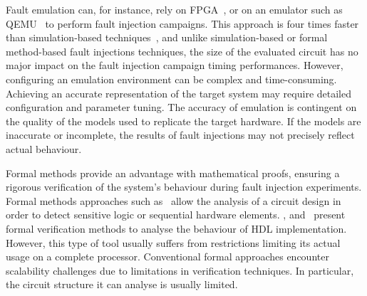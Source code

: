Fault emulation can, for instance, rely on FPGA~\cite{CMLCVR-11-crypto}, or on an emulator such as QEMU~\cite{HGASO-21-fdtc,BLK-23-access} to perform fault injection campaigns. This approach is four times faster than simulation-based techniques~\cite{NNHRS-14-dsd}, and unlike simulation-based or formal method-based fault injections techniques, the size of the evaluated circuit has no major impact on the fault injection campaign timing performances.
However, configuring an emulation environment can be complex and time-consuming. Achieving an accurate representation of the target system may require detailed configuration and parameter tuning. The accuracy of emulation is contingent on the quality of the models used to replicate the target hardware. If the models are inaccurate or incomplete, the results of fault injections may not precisely reflect actual behaviour.

Formal methods provide an advantage with mathematical proofs, ensuring a rigorous verification of the system's behaviour during fault injection experiments. Formal methods approaches such as~\cite{BSSMG-21-tches} allow the analysis of a circuit design in order to detect sensitive logic or sequential hardware elements. \cite{ANR-18-ices}, \cite{BBCFGS-19-esorics} and~\cite{SVPMRDKMS-24-eprint} present formal verification methods to analyse the behaviour of HDL implementation.
However, this type of tool usually suffers from restrictions limiting its actual usage on a complete processor.
Conventional formal approaches encounter scalability challenges due to limitations in verification techniques.
In particular, the circuit structure it can analyse is usually limited.

